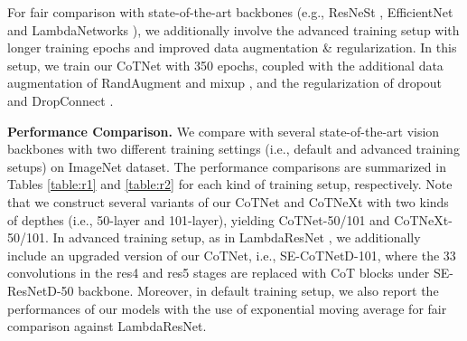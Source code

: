 \documentclass[10pt,twocolumn,letterpaper]{article}
\begin{document}
For fair comparison with state-of-the-art backbones (e.g., ResNeSt \cite{zhang2020resnest}, EfficientNet \cite{tan2019efficientnet} and LambdaNetworks \cite{bello2021lambdanetworks}), we additionally involve the advanced training setup with longer training epochs and improved data augmentation \& regularization. In this setup, we train our CoTNet with 350 epochs, coupled with the additional data augmentation of RandAugment \cite{cubuk2020randaugment} and mixup \cite{zhang2017mixup}, and the regularization of dropout \cite{srivastava2014dropout} and DropConnect \cite{wan2013regularization}.

\textbf{Performance Comparison.} We compare with several state-of-the-art vision backbones with two different training settings (i.e., default and advanced training setups) on ImageNet dataset. The performance comparisons are summarized in Tables \ref{table:r1} and \ref{table:r2} for each kind of training setup, respectively. Note that we construct several variants of our CoTNet and CoTNeXt with two kinds of depthes (i.e., 50-layer and 101-layer), yielding CoTNet-50/101 and CoTNeXt-50/101. In advanced training setup, as in LambdaResNet \cite{bello2021lambdanetworks}, we additionally include an upgraded version of our CoTNet, i.e., SE-CoTNetD-101, where the 33 convolutions in the res4 and res5 stages are replaced with CoT blocks under SE-ResNetD-50 \cite{he2019bag,bello2021revisiting} backbone. Moreover, in default training setup, we also report the performances of our models with the use of exponential moving average for fair comparison against LambdaResNet.
\end{document}
